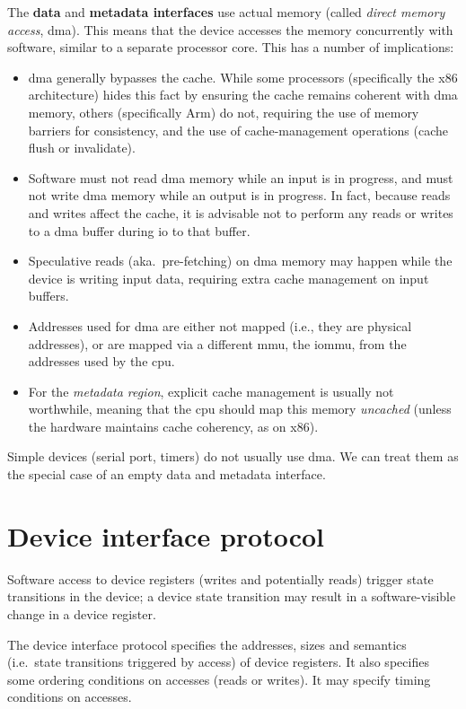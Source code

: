 \documentclass[a4paper,12pt]{report}
\newcommand{\Obj}[1]{\textsl{#1}}
\begin{document}
The \textbf{data} and \textbf{metadata interfaces} use
actual memory (called \emph{direct memory access},
\gls{dma}). This means that the device accesses the memory concurrently with software, similar to a separate
processor core. This has a number of implications:
\begin{itemize}
\item \gls{dma} generally bypasses the cache. While some processors (specifically the
  x86 architecture) hides this fact by ensuring the cache remains
  coherent with \gls{dma} memory, others (specifically Arm) do not,
  requiring the use of memory barriers for consistency, and the use of
  cache-management operations (cache flush or invalidate).
\item Software must not read \gls{dma} memory while an input is in progress,
  and must not write \gls{dma} memory while an output is in progress.  In
  fact, because reads and writes affect the cache, it is advisable not
  to perform any reads or writes to a \gls{dma} buffer during \gls{io} to that
  buffer.
\item Speculative reads (aka.\ pre-fetching) on \gls{dma} memory may happen
  while the device is writing input data, requiring extra cache
  management on input buffers.
\item Addresses used for \gls{dma} are either not mapped (i.e., they are
  physical addresses), or are mapped via a different \gls{mmu}, the \gls{iommu},
  from the addresses used by the \gls{cpu}.
\item For the \Obj{metadata region}, explicit cache management is
  usually not worthwhile, meaning that the \gls{cpu} should map this memory
  \emph{uncached} (unless the hardware maintains cache coherency, as
  on x86).
\end{itemize}

Simple devices (serial port, timers) do not usually use \gls{dma}. We can treat them
as the special case of an empty data and metadata interface.

\section{Device interface protocol}\label{s:dev_proto}

Software access to device registers (writes and potentially reads)
trigger state transitions in the device; a device state transition may
result in a software-visible change in a device register.

The device interface protocol specifies the addresses, sizes and
semantics (i.e.\ state transitions triggered by access) of device
registers. It also specifies some ordering conditions on accesses
(reads or writes). It
may specify timing conditions on accesses.
\end{document}
